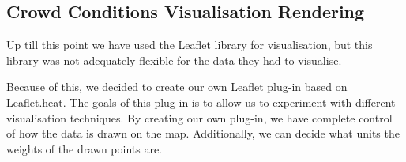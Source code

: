\subsection{Crowd Conditions Visualisation Rendering}\label{sec:own_leaflet_plugin}
Up till this point we have used the Leaflet library for visualisation, but this library was not adequately flexible for the data they had to visualise.

Because of this, we decided to create our own Leaflet plug-in based on Leaflet.heat. The goals of this plug-in is to allow us to experiment with different visualisation techniques. By creating our own plug-in, we have complete control of how the data is drawn on the map. Additionally, we can decide what units the weights of the drawn points are.